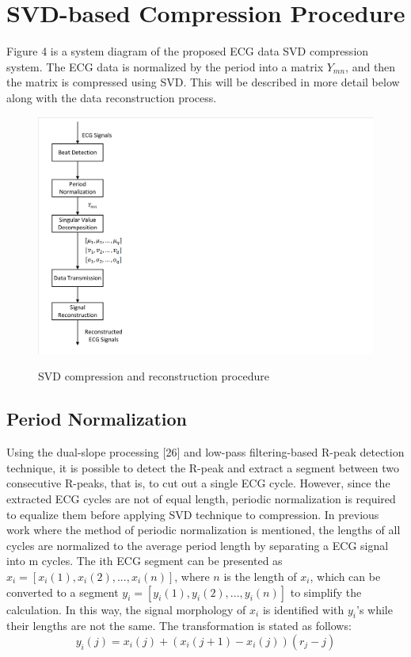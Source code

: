 \documentclass[journal]{IEEEtran}
\begin{document}
\section{SVD-based Compression Procedure}
Figure 4 is a system diagram of the proposed ECG data SVD compression system. The ECG data is normalized by the period into a matrix $Y_{mn}$, and then the matrix is compressed using SVD. This will be described in more detail below along with the data reconstruction process.
\begin{figure}[H]
	\centering
	\includegraphics[width=14cm]{procedure.pdf}\\
	\caption{SVD compression and reconstruction procedure}
	\label{liuchengtu1}
\end{figure}


\subsection{Period Normalization}
Using the dual-slope processing [26] and low-pass filtering-based R-peak detection technique, it is possible to detect the R-peak and extract a segment between two consecutive R-peaks, that is, to cut out a single ECG cycle. However, since the extracted ECG cycles are not of equal length, periodic normalization is required to equalize them before applying SVD technique to compression. In previous work where the method of periodic normalization is mentioned, the lengths of all cycles are normalized to the average period length by separating a ECG signal into m cycles. The ith ECG segment can be presented as $x_i = [x_i(1), x_i(2), . . . , x_i(n)]$, where $n$ is the length of $x_i$, which can be converted to a segment $y_i = [y_i(1), y_i(2), . . . , y_i(n)]$ to simplify the calculation. In this way, the signal morphology of $x_i$ is identified with $y_i$'s while their lengths are not the same. The transformation is stated as follows:
\begin{equation}
y_i(j) = x_i(j) + (x_i(j+1)-x_i(j))(r_j-j)
\end{equation}
\end{document}
